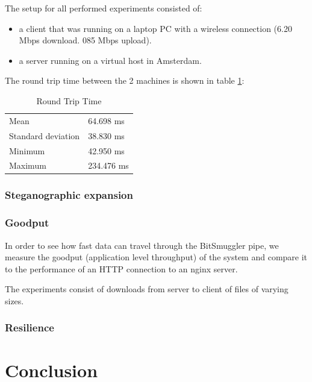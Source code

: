 \documentclass[11pt]{article} %
\newcommand{\projectName}{BitSmuggler }
\begin{document}
The setup for all performed experiments consisted of:
\begin{itemize}
\item a client that was running on a laptop PC with a wireless connection (6.20 Mbps download. 085 Mbps upload).
\item a server running on a virtual host in Amsterdam.
\end{itemize}

The round trip time between the 2 machines is shown in table \ref{table:rtt}:

\begin{table}[!htbp]
    \begin{tabular}{|l|l|}
    \hline
    Mean               & 64.698 ms  \\
    Standard deviation & 38.830 ms  \\
    Minimum            & 42.950 ms  \\
    Maximum            & 234.476 ms \\ \hline
    \end{tabular}
    \caption {Round Trip Time}
   \label{table:rtt}
\end{table}

\subsubsection{Steganographic expansion}

\subsubsection{Goodput}

In order to see how fast data can travel through the \projectName pipe, we measure the goodput (application level throughput) of the system and compare it to the performance of an HTTP connection to an nginx server.

The experiments consist of downloads from server to client of files of varying sizes.

\subsubsection{Resilience}

\section{Conclusion}
\end{document}

